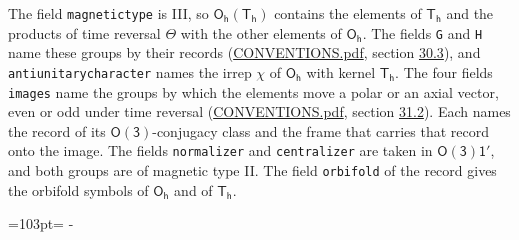 \documentclass[10pt,a4paper]{article}
\newcommand{\needspace}[1]{\par\penalty-100\begingroup\dimen0=#1\relax\dimen2=\pagegoal
  \advance\dimen2-\pagetotal\ifdim\dimen0>\dimen2\relax\ifdim\dimen2>0pt\vfil\break\fi\fi
  \endgroup}
\numberwithin{equation}{section}
\newcommand{\grp}[1]{\mathsf{#1}}
\begin{document}
The field \texttt{magnetictype} is III, so $\grp{O_{h}}(\grp{T_{h}})$ contains the elements of $\grp{T_{h}}$ and the products of time reversal $\varTheta$ with the other elements of $\grp{O_{h}}$. The fields \texttt{G} and \texttt{H} name these groups by their records (\href{../../CONVENTIONS.pdf}{CONVENTIONS.pdf}, section \href{../../CONVENTIONS.pdf\#conv.30.3}{30.3}), and \texttt{antiunitarycharacter} names the irrep $\chi$ of $\grp{O_{h}}$ with kernel $\grp{T_{h}}$. The four fields \texttt{images} name the groups by which the elements move a polar or an axial vector, even or odd under time reversal (\href{../../CONVENTIONS.pdf}{CONVENTIONS.pdf}, section \href{../../CONVENTIONS.pdf\#conv.31.2}{31.2}). Each names the record of its $\grp{O(3)}$-conjugacy class and the frame that carries that record onto the image. The fields \texttt{normalizer} and \texttt{centralizer} are taken in $\grp{O(3)1'}$, and both groups are of magnetic type II. The field \texttt{orbifold} of the record gives the orbifold symbols of $\grp{O_{h}}$ and of $\grp{T_{h}}$.
\needspace{103pt}
\end{document}
